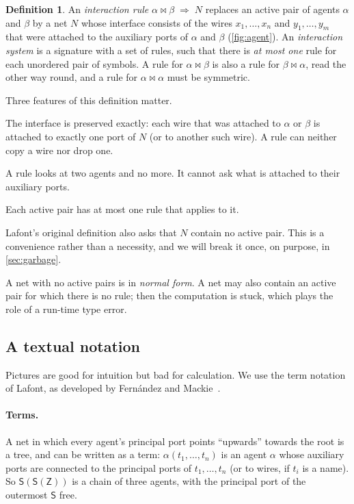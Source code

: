 \documentclass[11pt,a4paper]{article}
\newcommand{\ag}[1]{\mathsf{#1}}
\newcommand{\Z}{\ag{Z}}
\newcommand{\Sa}{\ag{S}}
\newcommand{\act}{\mathrel{\bowtie}}
\newcommand{\rul}{\;\Rightarrow\;}
\theoremstyle{definition}
\newtheorem{definition}{Definition}
\theoremstyle{plain}
\begin{document}
\begin{definition}
An \emph{interaction rule} $\alpha \act \beta \rul N$ replaces an active pair
of agents $\alpha$ and $\beta$ by a net $N$ whose interface consists of the
wires $x_1,\dots,x_n$ and $y_1,\dots,y_m$ that were attached to the auxiliary
ports of $\alpha$ and $\beta$ (\cref{fig:agent}). An \emph{interaction
system} is a signature with a set of rules, such that there is \emph{at most
one} rule for each unordered pair of symbols. A rule for $\alpha\act\beta$ is
also a rule for $\beta\act\alpha$, read the other way round, and a rule for
$\alpha \act \alpha$ must be symmetric.
\end{definition}

\noindent
Three features of this definition matter.

\begin{description}[itemsep=2pt, font=\normalfont\itshape]
\item[Linearity.] The interface is preserved exactly: each wire that was
  attached to $\alpha$ or $\beta$ is attached to exactly one port of $N$ (or
  to another such wire). A rule can neither copy a wire nor drop one.
\item[Binary interaction.] A rule looks at two agents and no more. It cannot
  ask what is attached to their auxiliary ports.
\item[No ambiguity.] Each active pair has at most one rule that applies to it.
\end{description}

\noindent
Lafont's original definition also asks that $N$ contain no active pair. This
is a convenience rather than a necessity, and we will break it once, on
purpose, in \cref{sec:garbage}.

A net with no active pairs is in \emph{normal form}. A net may also contain an
active pair for which there is no rule; then the computation is stuck, which
plays the role of a run-time type error.

\subsection{A textual notation}\label{sec:notation}

Pictures are good for intuition but bad for calculation. We use the term
notation of Lafont, as developed by Fernández and Mackie~\cite{fm99}.

\paragraph{Terms.} A net in which every agent's principal port points
``upwards'' towards the root is a tree, and can be written as a term:
$\alpha(t_1,\dots,t_n)$ is an agent $\alpha$ whose auxiliary ports are
connected to the principal ports of $t_1,\dots,t_n$ (or to wires, if $t_i$ is
a name). So $\Sa(\Sa(\Z))$ is a chain of three agents, with the principal
port of the outermost $\Sa$ free.
\end{document}
